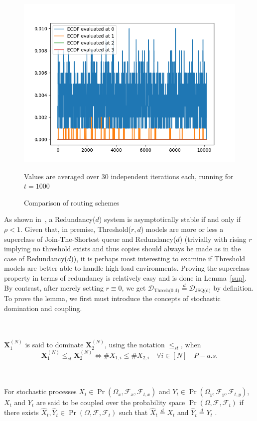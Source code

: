 \begin{figure}
    \centering
    \includegraphics[width=0.7\linewidth]{attimes} %
    \caption{Comparison of routing schemes}
    \medskip
    Values are averaged over 30 independent iterations each, running for $t=1000$
    \label{fig:img}
\end{figure}

As shown in~\cite{gardner_redundancy-d_2017}, a Redundancy($d$) system is asymptotically stable if and only if $\rho < 1 $. Given that, in premise, Threshold($r,d$) models are more or less a superclass of Join-The-Shortest queue and Redundancy($d$) (trivially with rising $r$  implying no threshold exists and thus copies should always be made as in the case of Redundancy($d$)), it is perhaps most interesting to examine if Threshold models are better able to handle high-load environments. Proving the superclass property in terms of redundancy is relatively easy and is done in Lemma~\ref{sup}. By contrast, after merely setting $r \equiv 0$, we get $ \mathcal{D}_{\text{Thresh(0,d)}} \overset{d}{=} \mathcal{D}_{\text{JSQ(d)}}$ by definition. To prove the lemma, we first must introduce the concepts of stochastic domination and coupling.
\begin{definition}
    \\~\\
    $\mathbf{X}_{1}^{(N)}$ is said to dominate $\mathbf{X}_{2}^{(N)}$, using the notation $\leq_{st}$, when
    \[\mathbf{X}_{1}^{(N)}\leq_{st}\mathbf{X}_{2}^{(N)} \iff\# X_{1,i} \leq \# X_{2,i}  \quad \forall i \in [N] \quad P-a.s.\]
\end{definition}

\begin{definition}
    \label{coupled}
    \\~\\
    For stochastic processes $X_{t} \in \Pr(\Omega_{x}, \mathcal{F}_{x}, \mathcal{F}_{t,x})$ and $Y_{t} \in \Pr(\Omega_{y}, \mathcal{F}_{y}, \mathcal{F}_{t,y})$,
    $X_{t}$ and $Y_{t}$ are said to be coupled over the probability space $\Pr(\Omega, \mathcal{F}, \mathcal{F}_{t})$ if there exists
    $\hat X_{t}, \hat Y_{t} \in \Pr(\Omega, \mathcal{F}, \mathcal{F}_{t})$ such that $\hat X_{t} \overset{d}{=}X_{t}$ and $\hat Y_{t} \overset{d}{=}Y_{t}$ \cite{bramson_asymptotic_2012}.
\end{definition}

